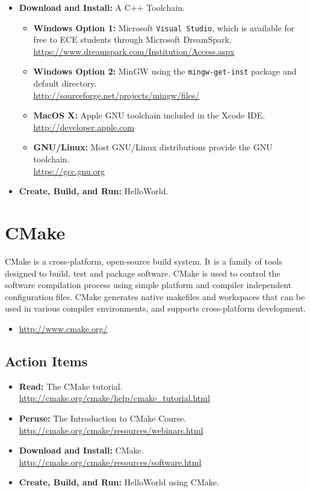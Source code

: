 \documentclass[11pt]{article}
\begin{document}
\begin{itemize}
\item \textbf{Download and Install:} A C++ Toolchain.
\begin{itemize}
\item \textbf{Windows Option 1:} Microsoft \texttt{Visual Studio}, which is available for free to ECE students through Microsoft DreamSpark.\\
\url{https://www.dreamspark.com/Institution/Access.aspx}
\item \textbf{Windows Option 2:} MinGW using the \texttt{mingw-get-inst} package and default directory.\\
\url{http://sourceforge.net/projects/mingw/files/}
\item \textbf{MacOS X:} Apple GNU toolchain included in the Xcode IDE.\\
\url{http://developer.apple.com}
\item \textbf{GNU/Linux:} Most GNU/Linux distributions provide the GNU toolchain.\\
\url{https://gcc.gnu.org}
\end{itemize}
\item \textbf{Create, Build, and Run:} HelloWorld.
\end{itemize}


\newpage
\section{CMake}

CMake is a cross-platform, open-source build system.
It is a family of tools designed to build, test and package software.
CMake is used to control the software compilation process using simple platform and compiler independent configuration files.
CMake generates native makefiles and workspaces that can be used in various compiler environments, and supports cross-platform development.
\begin{itemize}
\item \url{http://www.cmake.org/}
\end{itemize}


\subsection*{Action Items}

\begin{itemize}
\item \textbf{Read:} The CMake tutorial. \\
\url{http://cmake.org/cmake/help/cmake_tutorial.html}
\item \textbf{Peruse:} The Introduction to CMake Course. \\
\url{http://cmake.org/cmake/resources/webinars.html}
\item \textbf{Download and Install:} CMake. \\
\url{http://cmake.org/cmake/resources/software.html}
\item \textbf{Create, Build, and Run:} HelloWorld using CMake.
\end{itemize}
\end{document}
